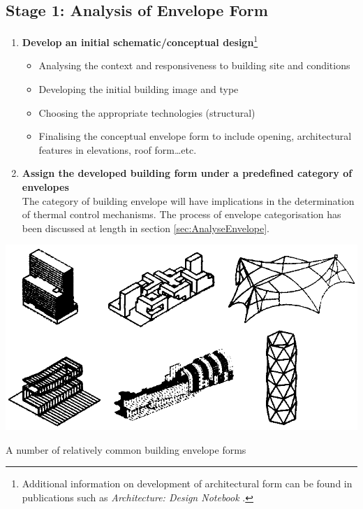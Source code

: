 \clearpage
\colorbox{95Gray}{%
	\begin{minipage}[c][20.5cm][t]{\textwidth}{%
		\subsection{Stage 1: Analysis of Envelope Form}
		\vspace{0.5cm}
		\begin{enumerate}
			\item \textbf{Develop an initial schematic/conceptual design}\footnote{Additional information on development of architectural form can be found in publications such as \emph{Architecture: Design Notebook} \cite{fawcett03}.}
				\begin{itemize}
					\item Analysing the context and responsiveness to building site and conditions
					\item Developing the initial building image and type
					\item Choosing the appropriate technologies (structural)
					\item Finalising the conceptual envelope form to include opening, architectural features in elevations, roof form\ldots etc.
				\end{itemize}
			\vspace{0.2cm}
			\item \textbf{Assign the developed building form under a predefined category of envelopes}\\[3mm]
				The category of building envelope will have implications in the determination of thermal control mechanisms. The process of envelope categorisation has been discussed at length in section \ref{sec:AnalyseEnvelope}.
		\end{enumerate}
		\includegraphics[width=\textwidth]{./Images/23-StageA}
		\begin{center}
		\small A number of relatively common building envelope forms
		\end{center}
	}%
\end{minipage}%
}

